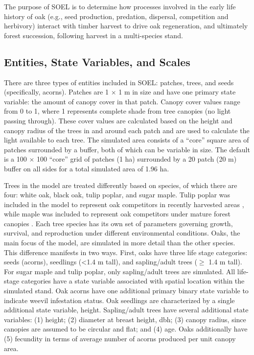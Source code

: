 \documentclass[
11pt, %
a4paper, %
oneside, %
headinclude,footinclude, %
]{scrartcl}
\begin{document}
The purpose of SOEL is to determine how processes involved in the early life history of oak (e.g., seed production, predation, dispersal, competition and herbivory) interact with timber harvest to drive oak regeneration, and ultimately forest succession, following harvest in a multi-species stand.

\subsection{Entities, State Variables, and Scales}

There are three types of entities included in SOEL: patches, trees, and seeds (specifically, acorns). Patches are 1 $\times$ 1 m in size and have one primary state variable: the amount of canopy cover in that patch. Canopy cover values range from 0 to 1, where 1 represents complete shade from tree canopies (no light passing through). These cover values are calculated based on the height and canopy radius of the trees in and around each patch and are used to calculate the light available to each tree. The simulated area consists of a “core” square area of patches surrounded by a buffer, both of which can be variable in size. The default is a 100 $\times$ 100 “core” grid of patches (1 ha) surrounded by a 20 patch (20 m) buffer on all sides for a total simulated area of 1.96 ha.

Trees in the model are treated differently based on species, of which there are four: white oak, black oak, tulip poplar, and sugar maple. Tulip poplar was included in the model to represent oak competitors in recently harvested areas \citep{Jenkins1998}, while maple was included to represent oak competitors under mature forest canopies \citep{Nowacki2008}. Each tree species has its own set of parameters governing growth, survival, and reproduction under different environmental conditions. Oaks, the main focus of the model, are simulated in more detail than the other species. This difference manifests in two ways. First, oaks have three life stage categories: seeds (acorns), seedlings (\textless 1.4 m tall), and sapling/adult trees ($\geq$ 1.4 m tall). For sugar maple and tulip poplar, only sapling/adult trees are simulated. All life-stage categories have a state variable associated with spatial location within the simulated stand. Oak acorns have one additional primary binary state variable to indicate weevil infestation status. Oak seedlings are characterized by a single additional state variable, height. Sapling/adult trees have several additional state variables: (1) height; (2) diameter at breast height, dbh; (3) canopy radius, since canopies are assumed to be circular and flat; and (4) age. Oaks additionally have (5) fecundity in terms of average number of acorns produced per unit canopy area.
\end{document}
